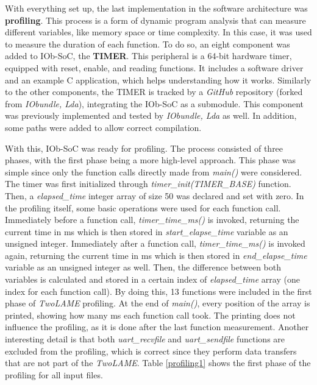 With everything set up, the last implementation in the software architecture was \textbf{profiling}. This process is a form of dynamic program analysis that can measure different variables, like memory space or time complexity. In this case, it was used to measure the duration of each function.
To do so, an eight component was added to IOb-SoC, the \textbf{TIMER}. This peripheral is a 64-bit hardware timer, equipped with reset, enable, and reading functions. It includes a software driver and an example C application, which helps understanding how it works. 
Similarly to the other components, the TIMER is tracked by a \textit{GitHub} repository (forked from \textit{IObundle, Lda}), integrating the IOb-SoC as a submodule. This component was previously implemented and tested by \textit{IObundle, Lda} as well. In addition, some paths were added to allow correct compilation.

With this, IOb-SoC was ready for profiling. The process consisted of three phases, with the first phase being a more high-level approach. 
This phase was simple since only the function calls directly made from \textit{main()} were considered. The timer was first initialized through \textit{timer\_init(TIMER\_BASE)} function. Then, a \textit{elapsed\_time} integer array of size 50 was declared and set with zero. In the profiling itself, some basic operations were used for each function call. Immediately before a function call, \textit{timer\_time\_ms()} is invoked, returning the current time in ms which is then stored in \textit{start\_elapse\_time} variable as an unsigned integer. Immediately after a function call, \textit{timer\_time\_ms()} is invoked again, returning the current time in ms which is then stored in \textit{end\_elapse\_time} variable as an unsigned integer as well. Then, the difference between both variables is calculated and stored in a certain index of \textit{elapsed\_time} array (one index for each function call). 
By doing this, 13 functions were included in the first phase of \textit{TwoLAME} profiling. At the end of \textit{main()}, every position of the array is printed, showing how many ms each function call took. The printing does not influence the profiling, as it is done after the last function measurement. Another interesting detail is that both \textit{uart\_recvfile} and \textit{uart\_sendfile} functions are excluded from the profiling, which is correct since they perform data transfers that are not part of the \textit{TwoLAME}.
Table \ref{profiling1} shows the first phase of the profiling for all input files.

